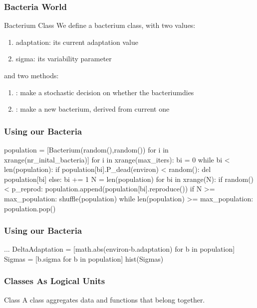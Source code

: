 \begin{frame}[fragile] 
\frametitle{Bacteria World}
\begin{block}{Bacterium Class}
We define a bacterium class, with two values:
\begin{enumerate}
\item adaptation: its current adaptation value
\item sigma: its variability parameter
\end{enumerate}
and two methods:
\begin{enumerate}
\item {}: make a stochastic decision on whether the bacteriumdies
\item {}: make a new bacterium, derived from current one
\end{enumerate}
\end{block}

\end{frame}

\begin{frame}[fragile] 
\frametitle{Using our Bacteria}
\begin{python}
population = [Bacterium(random(),random())
        for i in xrange(nr_inital_bacteria)]
for i in xrange(max_iters):
    bi = 0
    while bi < len(population):
        if population[bi].P_dead(environ) < random():
            del population[bi]
        else:
            bi += 1
    N = len(population)
    for bi in xrange(N):
        if random() < p_reprod:
            population.append(population[bi].reproduce())
    if N >= max_population:
        shuffle(population)
        while len(population) >= max_population:
            population.pop()
\end{python}
\end{frame}

\begin{frame}[fragile] 
\frametitle{Using our Bacteria}

\begin{python}
...
DeltaAdaptation = [math.abs(environ-b.adaptation) 
                    for b in population]
Sigmas = [b.sigma for b in population]
hist(Sigmas)
\end{python}

\end{frame}

\begin{frame}[fragile] 
\frametitle{Classes As Logical Units}
\begin{block}{Class}
A class aggregates data and functions that belong together.
\end{block}
\end{frame}

